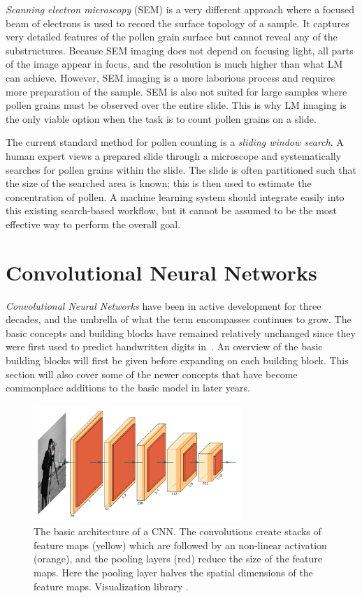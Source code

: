 \textit{Scanning electron microscopy} (SEM) is a very different approach where a focused beam of electrons is used to record the surface topology of a sample.
It captures very detailed features of the pollen grain surface but cannot reveal any of the substructures.
Because SEM imaging does not depend on focusing light, all parts of the image appear in focus, and the resolution is much higher than what LM can achieve.
However, SEM imaging is a more laborious process and requires more preparation of the sample.
SEM is also not suited for large samples where pollen grains must be observed over the entire slide.
This is why LM imaging is the only viable option when the task is to count pollen grains on a slide.

The current standard method for pollen counting is a \textit{sliding window search}.
A human expert views a prepared slide through a microscope and systematically searches for pollen grains within the slide.
The slide is often partitioned such that the size of the searched area is known; this is then used to estimate the concentration of pollen.
A machine learning system should integrate easily into this existing search-based workflow, but it cannot be assumed to be the most effective way to perform the overall goal.

\section{Convolutional Neural Networks}\label{sec:back-cnn}
\textit{Convolutional Neural Networks} have been in active development for three decades, and the umbrella of what the term encompasses continues to grow.
The basic concepts and building blocks have remained relatively unchanged since they were first used to predict handwritten digits in\ \textcite{1989Hdrw}.
An overview of the basic building blocks will first be given before expanding on each building block.
This section will also cover some of the newer concepts that have become commonplace additions to the basic model in later years.

\begin{figure}[htbp]
  \centering
  \includegraphics[width=0.7\textwidth]{figs/background/cnn-layers.pdf}
  \caption[Basic structure of a CNN]{The basic architecture of a CNN\@. The convolutions create stacks of feature maps (yellow) which are followed by an non-linear activation (orange), and the pooling layers (red) reduce the size of the feature maps. Here the pooling layer halves the spatial dimensions of the feature maps. Visualization library \parencite{haris_2018}.}\label{fig:back-cnn-example}
\end{figure}

